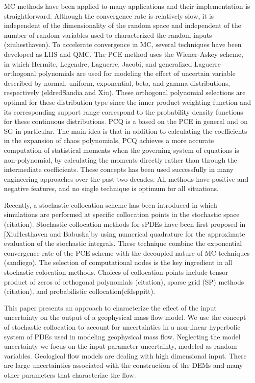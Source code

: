 \documentclass{article}
\begin{document}
MC methods have been applied to many applications and their implementation is straightforward.
Although the convergence rate is relatively slow, it is independent of the dimensionality of the random space and
independent of the number of random variables used to characterized the random inputs (xiuhesthaven). 
To accelerate convergence in MC, several techniques have been developed as LHS and QMC.
The PCE method uses the Wiener-Askey scheme, in which Hermite, Legendre, Laguerre, Jacobi, and generalized Laguerre
orthogonal polynomials are used for modeling the effect of uncertain variable described by normal, uniform, exponential, beta, 
and gamma distributions, respectively (eldredSandia and Xiu). These orthogonal polynomial selections are optimal for these
distribution type since the inner product weighting function and its corresponding support range correspond to the probability density 
functions for these continuous distributions. 
PCQ is a based on the PCE in general and on SG in particular. The main idea is that in addition to 
calculating the coefficients in the expansion of chaos polynomials, PCQ achieves a more accurate computation of statistical 
moments when the governing system of equations is non-polynomial, by calculating the moments directly rather than
through the intermediate coefficients.
These concepts has been used successfully in many engineering approaches over the past two decades. 
All methods have positive and negative features, and no single technique is optimum for all situations.

Recently, a stochastic collocation scheme has been introduced in which simulations are performed
at specific collocation points in the stochastic space (citation). Stochastic collocation methods for 
sPDEs have been first proposed in [XiuHesthaven and Babuska]by using numerical quadrature 
for the approximate evaluation of the stochastic integrals. 
These technique combine the exponential convergence rate of the PCE scheme with the
decoupled nature of MC techniques (sandiego). The selection of computational nodes is 
the key ingredient in all stochastic colocation methods. Choices of collocation points include
tensor product of zeros of orthogonal polynomials (citation), sparse grid (SP) methods (citation),
and probabilistic collocation(cfdsppitt).


This paper presents an approach to characterize the effect of the input uncertainty on the output 
of a geophysical mass flow model. We use the concept of stochastic collocation to account for 
uncertainties in a non-linear hyperbolic system of PDEs used in modeling geophysical mass 
flow. Neglecting the model uncertainty we focus on the input parameter uncertainty, modeled as 
random variables. Geological flow models are dealing with high dimensional input. There are large 
uncertainties associated with the construction of the DEMs and many other parameters that characterize 
the flow.
\end{document}

